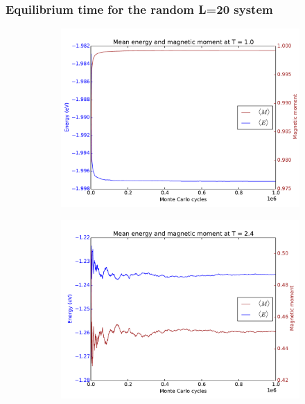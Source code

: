 \subsubsection{Equilibrium time  for the random L=20 system}





	\begin{figure}[H]
	\begin{subfigure}[b]{0.49\textwidth}
		\includegraphics[width=1\linewidth]{../results/4c/En_mag_T1_0}
		\caption{}
		\label{fig:L20_mag_T_1}
	\end{subfigure}
	\hfill
	\begin{subfigure}[b]{0.49\textwidth}
		\includegraphics[width=1\linewidth]{../results/4c/En_mag_T2_4}
		\caption{}
		\label{fig:L20_mag_T_2-4}
	\end{subfigure}
	\caption{}
\end{figure}




